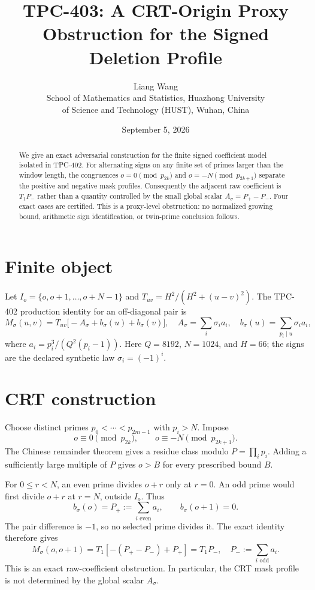 \documentclass[11pt]{article}
\title{TPC-403: A CRT-Origin Proxy Obstruction for the Signed Deletion Profile}
\author{Liang Wang\\School of Mathematics and Statistics, Huazhong University\\of Science and Technology (HUST), Wuhan, China}
\date{September 5, 2026}
\begin{document}
\maketitle
\begin{abstract}
We give an exact adversarial construction for the finite signed coefficient
model isolated in TPC-402.  For alternating signs on any finite set of primes
larger than the window length, the congruences $o=0\pmod {p_{2k}}$ and
$o=-N\pmod {p_{2k+1}}$ separate the positive and negative mask profiles.
Consequently the adjacent raw coefficient is $T_1P_-$ rather than a quantity
controlled by the small global scalar $A_\sigma=P_+-P_-$.  Four exact cases
are certified.  This is a proxy-level obstruction: no normalized growing
bound, arithmetic sign identification, or twin-prime conclusion follows.
\end{abstract}

\section{Finite object}
Let $I_o=\{o,o+1,\ldots,o+N-1\}$ and
$T_{uv}=H^2/(H^2+(u-v)^2)$.  The TPC-402 production identity for an
off-diagonal pair is
\[
 M_\sigma(u,v)=T_{uv}\bigl[-A_\sigma+b_\sigma(u)+b_\sigma(v)\bigr],
\quad A_\sigma=\sum_i\sigma_i a_i,\quad
 b_\sigma(u)=\sum_{p_i\mid u}\sigma_i a_i,
\]
where $a_i=p_i^3/(Q^2(p_i-1))$.  Here $Q=8192$, $N=1024$, and $H=66$;
the signs are the declared synthetic law $\sigma_i=(-1)^i$.

\section{CRT construction}
Choose distinct primes $p_0<\cdots<p_{2m-1}$ with $p_i>N$.  Impose
\[
 o\equiv0\pmod {p_{2k}},\qquad o\equiv-N\pmod {p_{2k+1}}. \tag{1}
\]
The Chinese remainder theorem gives a residue class modulo
$P=\prod_i p_i$.  Adding a sufficiently large multiple of $P$ gives
$o>B$ for every prescribed bound $B$.

For $0\le r<N$, an even prime divides $o+r$ only at $r=0$.  An odd prime
would first divide $o+r$ at $r=N$, outside $I_o$.  Thus
\[
 b_\sigma(o)=P_+:=\sum_{i\text{ even}}a_i,\qquad
 b_\sigma(o+1)=0.
\]
The pair difference is $-1$, so no selected prime divides it.  The exact
identity therefore gives
\[
 M_\sigma(o,o+1)=T_1[-(P_+-P_-)+P_+]=T_1P_-,
 \quad P_-:=\sum_{i\text{ odd}}a_i. \tag{2}
\]
This is an exact raw-coefficient obstruction.  In particular, the CRT mask
profile is not determined by the global scalar $A_\sigma$.
\end{document}
